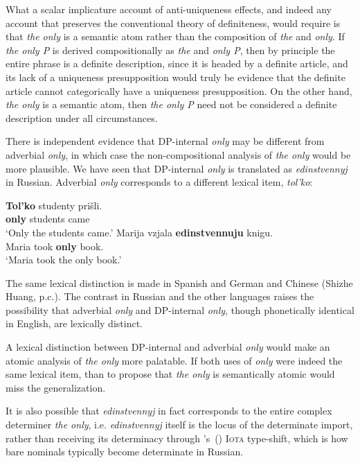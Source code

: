 \documentclass{article}
\newcommand{\citegen}[1]{\citeauthor{#1}'s~(\citeyear{#1})}
\begin{document}
What a scalar implicature account of anti-uniqueness effects, and indeed any account that preserves the conventional theory of definiteness, would require is that \textit{the only} is a semantic atom rather than the composition of \textit{the} and \textit{only}. If \textit{the only P} is derived compositionally as \textit{the} and \textit{only P}, then by principle the entire phrase is a definite description, since it is headed by a definite article, and its lack of a uniqueness presupposition would truly be evidence that the definite article cannot categorically have a uniqueness presupposition. On the other hand, \textit{the only} is a semantic atom, then \textit{the only P} need not be considered a definite description under all circumstances.

There is independent evidence that DP-internal \textit{only} may be different from adverbial \textit{only}, in which case the non-compositional analysis of \textit{the only} would be more plausible. We have seen that DP-internal \textit{only} is translated as \textit{edinstvennyj} in Russian. Adverbial \textit{only} corresponds to a different lexical item, \textit{tol'ko}:

\begin{exe}
	\ex \label{only-tolko} \gll \textbf{Tol'ko} studenty pri\v{s}li.\\
	\textbf{only} students came\\
	\glt `Only the students came.'
	\ex \label{only-edin} \gll Marija vzjala \textbf{edinstvennuju} knigu.\\
	Maria took \textbf{only} book.\\
	\glt `Maria took the only book.'
\end{exe}

The same lexical distinction is made in Spanish and German \citep{mcnally08} and Chinese (Shizhe Huang, p.c.). The contrast in Russian and the other languages raises the possibility that adverbial \textit{only} and DP-internal \textit{only}, though phonetically identical in English, are lexically distinct.

A lexical distinction between DP-internal and adverbial \textit{only} would make an atomic analysis of \textit{the only} more palatable. If both uses of \textit{only} were indeed the same lexical item, than to propose that \textit{the only} is semantically atomic would miss the generalization. %

It is also possible that \textit{edinstvennyj} in fact corresponds to the entire complex determiner \textit{the only}, i.e. \textit{edinstvennyj} itself is the locus of the determinate import, rather than receiving its determinacy through \citegen{partee86} \textsc{Iota} type-shift, which is how bare nominals typically become determinate in Russian.
\end{document}
